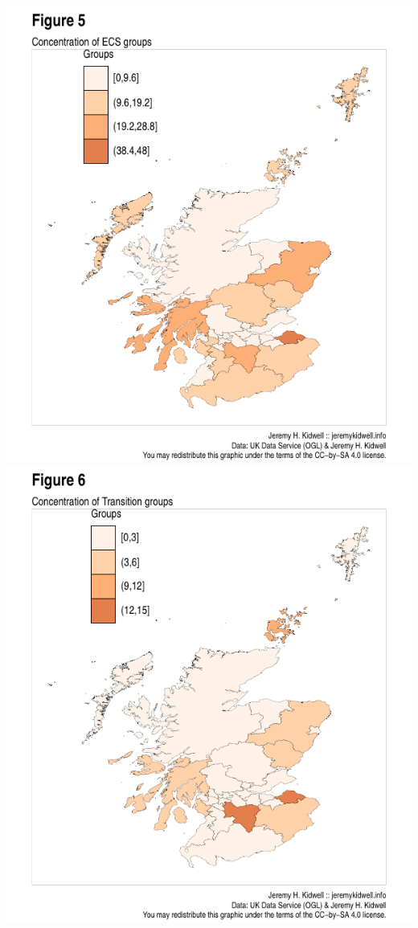 \documentclass[11pt,]{article}
\begin{document}
\includegraphics{figures/create_choropleth_others-1.pdf}
\includegraphics{figures/create_choropleth_others-2.pdf}
\end{document}
